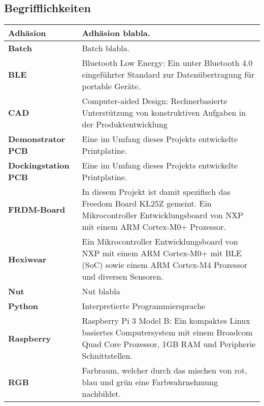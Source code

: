 \subsection*{Begrifflichkeiten}
\begin{table}[H]
	
	\begin{tabular}{|L{4.5cm}|L{11cm}|}
		\hline
		\textbf{Adhäsion} & Adhäsion blabla.\\
		
		\hline
		\textbf{Batch} & Batch blabla.\\
		
		\hline
		\textbf{BLE} & Bluetooth Low Energy: Ein unter Bluetooth 4.0 eingeführter Standard zur Datenübertragung für portable Geräte.\\
		
		\hline
		\textbf{CAD} & Computer-aided Design: Rechnerbasierte Unterstützung von konstruktiven Aufgaben in der Produktentwicklung \\
		
		\hline		
		\textbf{Demonstrator PCB} & Eine im Umfang dieses Projekts entwickelte Printplatine.\\
		
		\hline		
		\textbf{Dockingstation PCB} & Eine im Umfang dieses Projekts entwickelte Printplatine.\\
		
		\hline		
		\textbf{FRDM-Board} & In diesem Projekt ist damit spezifisch das Freedom Board KL25Z gemeint. Ein Mikrocontroller Entwicklungsboard von NXP mit einem ARM Cortex-M0+ Prozessor. \\
		
		\hline
		\textbf{Hexiwear} & Ein Mikrocontroller Entwicklungsboard von NXP mit einem ARM Cortex-M0+ mit BLE (SoC) sowie einem ARM Cortex-M4 Prozessor und diversen Sensoren.\\
		
		\hline
		\textbf{Nut} & Nut blabla\\	
			
		\hline
		\textbf{Python} & Interpretierte Programmiersprache \\
		
		\hline		
		\textbf{Raspberry} & Raspberry Pi 3 Model B: Ein kompaktes Linux basiertes Computersystem mit einem Broadcom Quad Core Prozessor, 1GB RAM und Peripherie Schnittstellen. \\	
		
		\hline
		\textbf{RGB} &  Farbraum, welcher durch das mischen von rot, blau und grün eine Farbwahrnehmung nachbildet. \\
		

\end{tabular}
\end{table}
